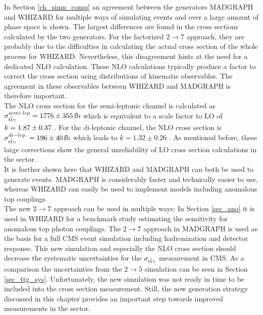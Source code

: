 In Section \ref{ch_simu_comp} an agreement between the generators MADGRAPH and WHIZARD for multiple ways of simulating \ttgamma events and over a large amount of phase space is shown. The largest differences are found in the cross sections calculated by the two generators. For the factorized $2 \to 7$ approach, they are probably due to the difficulties in calculating the actual cross section of the whole process for WHIZARD. Nevertheless, this disagreement hints at the need for a dedicated NLO calculation. These NLO calculations typically produce a factor to correct the cross section using distributions of kinematic observables. The agreement in these observables between WHIZARD and MADGRAPH is therefore important.\\
The NLO cross section for the semi-leptonic channel is calculated as $\sigma_{\ttgamma}^{semi.lep} = \SI{1776 \pm 355}{\femto \barn}$ which is equivalent to a scale factor to LO of $k = \SI{1.87 \pm 0.37}{}$ \cite{Melnikov:2011ta}. For the di-leptonic channel, the NLO cross section is $\sigma_{\ttgamma}^{di-lep.} = \SI{196 \pm 40}{\femto \barn}$ which leads to $k = 1.32 \pm 0.26$ \cite{Melnikov:2011ta}. As mentioned before, these large corrections show the general unreliability of LO cross section calculations in the \ttgamma sector.\\
It is further shown here that WHIZARD and MADGRAPH can both be used to generate \ttgamma events. MADGRAPH is considerably faster and technically easier to use, whereas WHIZARD can easily be used to implement models including anomalous top couplings. \\
The new $2 \to 7$ approach can be used in multiple ways: In Section \ref{sec_ano} it is used in WHIZARD  for a benchmark study estimating the sensitivity for anomalous top photon couplings. The $2 \to 7$ approach in MADGRAPH is used as the basis for a full CMS event simulation including hadronization and detector response. This new simulation and especially the NLO cross section should decrease the systematic uncertainties for the $\sigma_{\mathrm{t}\overline{\mathrm{t}} \gamma}$ measurement in CMS. As a comparison the uncertainties from the $2 \to 5$ simulation can be seen in  Section \ref{sec_ttg_sys}.
Unfortunately, the new simulation was not ready in time to be included into the cross section measurement. 
Still, the new generation strategy discussed in this chapter provides an important step towards improved measurements in the \ttgamma sector.